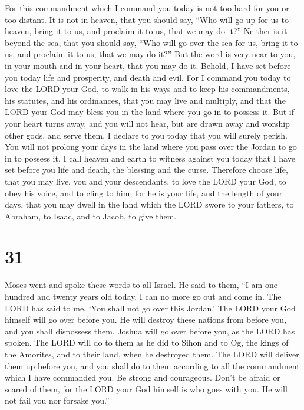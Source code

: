  For this commandment which I command you today is not too
hard for you or too distant.  It is not in heaven, that you
should say, ``Who will go up for us to heaven, bring it to us, and
proclaim it to us, that we may do it?''  Neither is it
beyond the sea, that you should say, ``Who will go over the sea for us,
bring it to us, and proclaim it to us, that we may do it?''
 But the word is very near to you, in your mouth and in
your heart, that you may do it.  Behold, I have set before
you today life and prosperity, and death and evil.  For I
command you today to love the LORD your God, to walk in his ways and to
keep his commandments, his statutes, and his ordinances, that you may
live and multiply, and that the LORD your God may bless you in the land
where you go in to possess it.  But if your heart turns
away, and you will not hear, but are drawn away and worship other gods,
and serve them,  I declare to you today that you will
surely perish. You will not prolong your days in the land where you pass
over the Jordan to go in to possess it.  I call heaven and
earth to witness against you today that I have set before you life and
death, the blessing and the curse. Therefore choose life, that you may
live, you and your descendants,  to love the LORD your God,
to obey his voice, and to cling to him; for he is your life, and the
length of your days, that you may dwell in the land which the LORD swore
to your fathers, to Abraham, to Isaac, and to Jacob, to give them.

\hypertarget{section-30}{%
\section{31}\label{section-30}}

 Moses went and spoke these words to all Israel.
 He said to them, ``I am one hundred and twenty years old
today. I can no more go out and come in. The LORD has said to me, `You
shall not go over this Jordan.'  The LORD your God himself
will go over before you. He will destroy these nations from before you,
and you shall dispossess them. Joshua will go over before you, as the
LORD has spoken.  The LORD will do to them as he did to
Sihon and to Og, the kings of the Amorites, and to their land, when he
destroyed them.  The LORD will deliver them up before you,
and you shall do to them according to all the commandment which I have
commanded you.  Be strong and courageous. Don't be afraid or
scared of them, for the LORD your God himself is who goes with you. He
will not fail you nor forsake you.''

